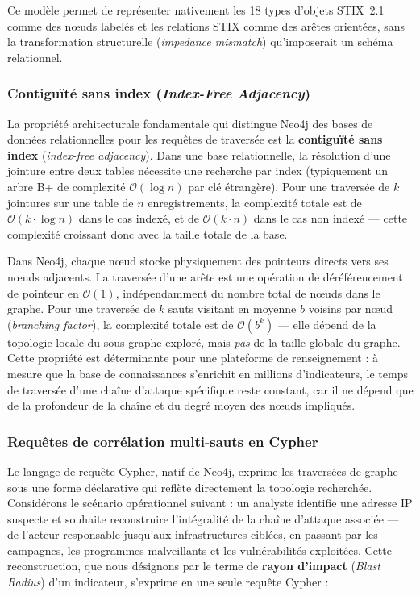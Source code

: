 Ce modèle permet de représenter nativement les 18 types d'objets STIX~2.1 comme des n\oe uds labelés et les relations STIX comme des arêtes orientées, sans la transformation structurelle (\textit{impedance mismatch}) qu'imposerait un schéma relationnel.

\subsubsection{Contiguïté sans index (\textit{Index-Free Adjacency})}

La propriété architecturale fondamentale qui distingue Neo4j des bases de données relationnelles pour les requêtes de traversée est la \textbf{contiguïté sans index} (\textit{index-free adjacency}). Dans une base relationnelle, la résolution d'une jointure entre deux tables nécessite une recherche par index (typiquement un arbre B+ de complexité $\mathcal{O}(\log n)$ par clé étrangère). Pour une traversée de $k$ jointures sur une table de $n$ enregistrements, la complexité totale est de $\mathcal{O}(k \cdot \log n)$ dans le cas indexé, et de $\mathcal{O}(k \cdot n)$ dans le cas non indexé --- cette complexité croissant donc avec la taille totale de la base.

Dans Neo4j, chaque n\oe ud stocke physiquement des pointeurs directs vers ses n\oe uds adjacents. La traversée d'une arête est une opération de déréférencement de pointeur en $\mathcal{O}(1)$, indépendamment du nombre total de n\oe uds dans le graphe. Pour une traversée de $k$ sauts visitant en moyenne $b$ voisins par n\oe ud (\textit{branching factor}), la complexité totale est de $\mathcal{O}(b^k)$ --- elle dépend de la topologie locale du sous-graphe exploré, mais \textit{pas} de la taille globale du graphe. Cette propriété est déterminante pour une plateforme de renseignement : à mesure que la base de connaissances s'enrichit en millions d'indicateurs, le temps de traversée d'une chaîne d'attaque spécifique reste constant, car il ne dépend que de la profondeur de la chaîne et du degré moyen des n\oe uds impliqués.

\subsubsection{Requêtes de corrélation multi-sauts en Cypher}

Le langage de requête Cypher, natif de Neo4j, exprime les traversées de graphe sous une forme déclarative qui reflète directement la topologie recherchée. Considérons le scénario opérationnel suivant : un analyste identifie une adresse IP suspecte et souhaite reconstruire l'intégralité de la chaîne d'attaque associée --- de l'acteur responsable jusqu'aux infrastructures ciblées, en passant par les campagnes, les programmes malveillants et les vulnérabilités exploitées. Cette reconstruction, que nous désignons par le terme de \textbf{rayon d'impact} (\textit{Blast Radius}) d'un indicateur, s'exprime en une seule requête Cypher :

